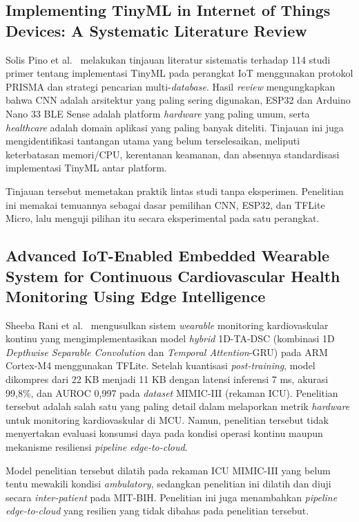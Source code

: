 \subsection{Implementing TinyML in Internet of Things Devices: A Systematic Literature Review}

Solis Pino et al.~\cite{tinyml_iot_review} melakukan tinjauan literatur sistematis terhadap 114 studi primer tentang implementasi TinyML pada perangkat IoT menggunakan protokol PRISMA dan strategi pencarian multi-\textit{database}. Hasil \textit{review} mengungkapkan bahwa CNN adalah arsitektur yang paling sering digunakan, ESP32 dan Arduino Nano 33 BLE Sense adalah platform \textit{hardware} yang paling umum, serta \textit{healthcare} adalah domain aplikasi yang paling banyak diteliti. Tinjauan ini juga mengidentifikasi tantangan utama yang belum terselesaikan, meliputi keterbatasan memori/CPU, kerentanan keamanan, dan absennya standardisasi implementasi TinyML antar platform.

Tinjauan tersebut memetakan praktik lintas studi tanpa eksperimen. Penelitian ini memakai temuannya sebagai dasar pemilihan CNN, ESP32, dan TFLite Micro, lalu menguji pilihan itu secara eksperimental pada satu perangkat.

\subsection{Advanced IoT-Enabled Embedded Wearable System for Continuous Cardiovascular Health Monitoring Using Edge Intelligence}

Sheeba Rani et al.~\cite{sheeba_rani_2026} mengusulkan sistem \textit{wearable} monitoring kardiovaskular kontinu yang mengimplementasikan model \textit{hybrid} 1D-TA-DSC (kombinasi 1D \textit{Depthwise Separable Convolution} dan \textit{Temporal Attention}-GRU) pada ARM Cortex-M4 menggunakan TFLite. Setelah kuantisasi \textit{post-training}, model dikompres dari 22 KB menjadi 11 KB dengan latensi inferensi 7 ms, akurasi 99,8\%, dan AUROC 0,997 pada \textit{dataset} MIMIC-III (rekaman ICU). Penelitian tersebut adalah salah satu yang paling detail dalam melaporkan metrik \textit{hardware} untuk monitoring kardiovaskular di MCU. Namun, penelitian tersebut tidak menyertakan evaluasi konsumsi daya pada kondisi operasi kontinu maupun mekanisme resiliensi \textit{pipeline} \textit{edge-to-cloud}.

Model penelitian tersebut dilatih pada rekaman ICU MIMIC-III yang belum tentu mewakili kondisi \textit{ambulatory}, sedangkan penelitian ini dilatih dan diuji secara \textit{inter-patient} pada MIT-BIH. Penelitian ini juga menambahkan \textit{pipeline} \textit{edge-to-cloud} yang resilien yang tidak dibahas pada penelitian tersebut.

